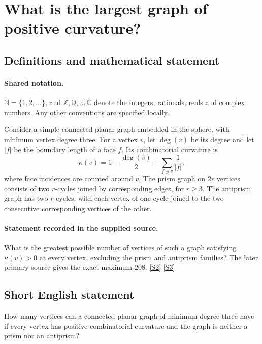\documentclass[11pt]{article}
\newcommand{\sref}[2]{\hyperlink{source:#1:#2}{[S#2]}}
\begin{document}
\section{What is the largest graph of positive curvature?}\label{statement}

\subsection{Definitions and mathematical statement}

\paragraph{Shared notation.}$\mathbb N=\{1,2,\ldots\}$, and $\mathbb Z,\mathbb Q,\mathbb R,\mathbb C$ denote the integers, rationals, reals and complex numbers. Any other conventions are specified locally.


Consider a simple connected planar graph embedded in the sphere, with minimum vertex degree three. For a vertex $v$, let $\deg(v)$ be its degree and let $|f|$ be the boundary length of a face $f$. Its combinatorial curvature is\[ \kappa(v)=1-\frac{\deg(v)}2+\sum_{f\ni v}\frac1{|f|}, \] where face incidences are counted around $v$. The prism graph on $2r$ vertices consists of two $r$-cycles joined by corresponding edges, for $r\geq3$. The antiprism graph has two $r$-cycles, with each vertex of one cycle joined to the two consecutive corresponding vertices of the other.
\paragraph{Statement recorded in the supplied source.}
What is the greatest possible number of vertices of such a graph satisfying $\kappa(v)>0$ at every vertex, excluding the prism and antiprism families? The later primary source gives the exact maximum $208$. \sref{statement}{2} \sref{statement}{3}
\subsection{Short English statement}
How many vertices can a connected planar graph of minimum degree three have if every vertex has positive combinatorial curvature and the graph is neither a prism nor an antiprism?
\end{document}
